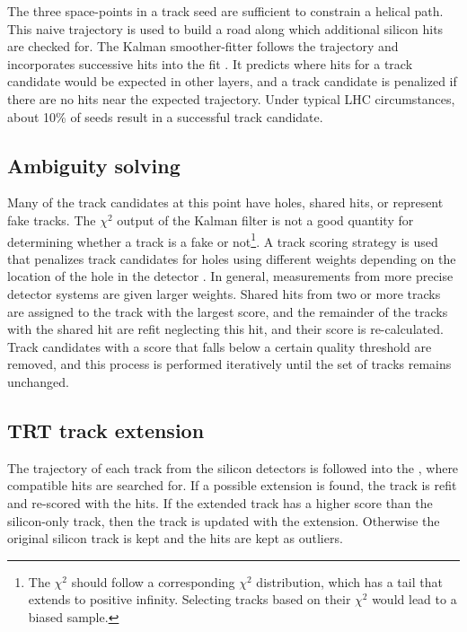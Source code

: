 The three space-points in a track seed are sufficient to constrain a helical path.
This naive trajectory is used to build a road along which additional silicon hits are checked for.
The Kalman smoother-fitter follows the trajectory and incorporates successive hits into the fit \cite{Cornelissen:2008zza}. %
It predicts where hits for a track candidate would be expected in other layers, and a track candidate is penalized if there are no hits near the expected trajectory. %
Under typical LHC circumstances, about 10\% of seeds result in a successful track candidate.

\subsection{Ambiguity solving} %

Many of the track candidates at this point have holes, shared hits, or represent fake tracks.
The $\chi^2$ output of the Kalman filter is not a good quantity for determining whether a track is a fake or not\footnote{The $\chi^2$ should follow a corresponding $\chi^2$ distribution, which has a tail that extends to positive infinity. Selecting tracks based on their $\chi^2$ would lead to a biased sample.}.
A track scoring strategy is used that penalizes track candidates for holes using different weights depending on the location of the hole in the detector \cite{Wicke:1998efw}.
In general, measurements from more precise detector systems are given larger weights.
Shared hits from two or more tracks are assigned to the track with the largest score, and the remainder of the tracks with the shared hit are refit neglecting this hit, and their score is re-calculated.
Track candidates with a score that falls below a certain quality threshold are removed, and this process is performed iteratively until the set of tracks remains unchanged.

\subsection{TRT track extension}

The trajectory of each track from the silicon detectors is followed into the \trt, where compatible hits are searched for.
If a possible extension is found, the track is refit and re-scored with the \trt hits.
If the extended track has a higher score than the silicon-only track, then the track is updated with the extension.
Otherwise the original silicon track is kept and the \trt hits are kept as outliers.

